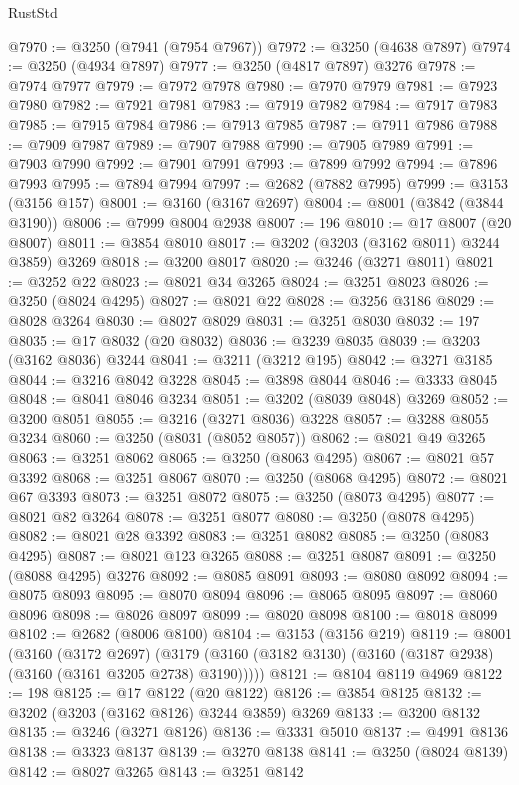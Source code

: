 \begin{lexlean}{RustStd}
\begin{coremodule}
@7970 := @3250 (@7941 (@7954 @7967))
@7972 := @3250 (@4638 @7897)
@7974 := @3250 (@4934 @7897)
@7977 := @3250 (@4817 @7897) @3276
@7978 := @7974 @7977
@7979 := @7972 @7978
@7980 := @7970 @7979
@7981 := @7923 @7980
@7982 := @7921 @7981
@7983 := @7919 @7982
@7984 := @7917 @7983
@7985 := @7915 @7984
@7986 := @7913 @7985
@7987 := @7911 @7986
@7988 := @7909 @7987
@7989 := @7907 @7988
@7990 := @7905 @7989
@7991 := @7903 @7990
@7992 := @7901 @7991
@7993 := @7899 @7992
@7994 := @7896 @7993
@7995 := @7894 @7994
@7997 := @2682 (@7882 @7995)
@7999 := @3153 (@3156 @157)
@8001 := @3160 (@3167 @2697)
@8004 := @8001 (@3842 (@3844 @3190))
@8006 := @7999 @8004 @2938
@8007 := 196
@8010 := @17 @8007 (@20 @8007)
@8011 := @3854 @8010
@8017 := @3202 (@3203 (@3162 @8011) @3244 @3859) @3269
@8018 := @3200 @8017
@8020 := @3246 (@3271 @8011)
@8021 := @3252 @22
@8023 := @8021 @34 @3265
@8024 := @3251 @8023
@8026 := @3250 (@8024 @4295)
@8027 := @8021 @22
@8028 := @3256 @3186
@8029 := @8028 @3264
@8030 := @8027 @8029
@8031 := @3251 @8030
@8032 := 197
@8035 := @17 @8032 (@20 @8032)
@8036 := @3239 @8035
@8039 := @3203 (@3162 @8036) @3244
@8041 := @3211 (@3212 @195)
@8042 := @3271 @3185
@8044 := @3216 @8042 @3228
@8045 := @3898 @8044
@8046 := @3333 @8045
@8048 := @8041 @8046 @3234
@8051 := @3202 (@8039 @8048) @3269
@8052 := @3200 @8051
@8055 := @3216 (@3271 @8036) @3228
@8057 := @3288 @8055 @3234
@8060 := @3250 (@8031 (@8052 @8057))
@8062 := @8021 @49 @3265
@8063 := @3251 @8062
@8065 := @3250 (@8063 @4295)
@8067 := @8021 @57 @3392
@8068 := @3251 @8067
@8070 := @3250 (@8068 @4295)
@8072 := @8021 @67 @3393
@8073 := @3251 @8072
@8075 := @3250 (@8073 @4295)
@8077 := @8021 @82 @3264
@8078 := @3251 @8077
@8080 := @3250 (@8078 @4295)
@8082 := @8021 @28 @3392
@8083 := @3251 @8082
@8085 := @3250 (@8083 @4295)
@8087 := @8021 @123 @3265
@8088 := @3251 @8087
@8091 := @3250 (@8088 @4295) @3276
@8092 := @8085 @8091
@8093 := @8080 @8092
@8094 := @8075 @8093
@8095 := @8070 @8094
@8096 := @8065 @8095
@8097 := @8060 @8096
@8098 := @8026 @8097
@8099 := @8020 @8098
@8100 := @8018 @8099
@8102 := @2682 (@8006 @8100)
@8104 := @3153 (@3156 @219)
@8119 := @8001
    (@3160
      (@3172 @2697)
      (@3179 (@3160 (@3182 @3130) (@3160 (@3187 @2938) (@3160 (@3161 @3205 @2738) @3190)))))
@8121 := @8104 @8119 @4969
@8122 := 198
@8125 := @17 @8122 (@20 @8122)
@8126 := @3854 @8125
@8132 := @3202 (@3203 (@3162 @8126) @3244 @3859) @3269
@8133 := @3200 @8132
@8135 := @3246 (@3271 @8126)
@8136 := @3331 @5010
@8137 := @4991 @8136
@8138 := @3323 @8137
@8139 := @3270 @8138
@8141 := @3250 (@8024 @8139)
@8142 := @8027 @3265
@8143 := @3251 @8142

\end{coremodule}
\end{lexlean}
